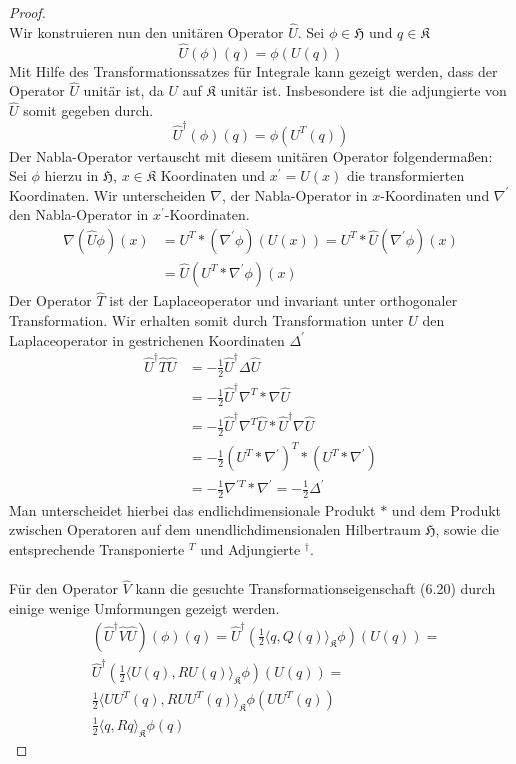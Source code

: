 \documentclass[11pt,a4paper,leqno]{report}
\numberwithin{equation}{chapter}
\begin{document}
\begin{proof}
\begin{equation*}
	\end{equation*}
	Wir konstruieren nun den unit\"aren Operator $\hat{U}$. Sei $\phi\in\mathfrak{H}$ und $q\in\mathfrak{K}$
	\begin{equation*}
		\hat{U}(\phi)(q)=\phi(U(q))
	\end{equation*}
	Mit Hilfe des Transformationssatzes f\"ur Integrale kann gezeigt werden, dass der Operator $\hat{U}$ unit\"ar ist, da $U$ auf $\mathfrak{K}$ unit\"ar ist. Insbesondere ist die adjungierte von $\hat{U}$ somit gegeben durch.	
	\begin{equation*}
		\hat{U}^\dagger(\phi)(q)=\phi(U^T(q))
	\end{equation*}
	Der Nabla-Operator vertauscht mit diesem unit\"aren Operator folgendermaßen:\\
	Sei $\phi$ hierzu in $\mathfrak{H}$, $x\in \mathfrak{K}$ Koordinaten und $x^{'} = U(x)$ die transformierten Koordinaten.  Wir unterscheiden $\nabla$, der Nabla-Operator in $x$-Koordinaten und $\nabla^{'}$ den Nabla-Operator in $x^{'}$-Koordinaten. 
	\begin{align}
		\nabla (\hat{U}\phi)(x) &= U^T * (\nabla^{'} \phi) (U(x)) = U^T * \hat{U}(\nabla^{'} \phi) (x)\\&= \hat{U}(U^T * \nabla^{'} \phi) (x)
	\end{align}
	Der Operator $\hat{T}$ ist der Laplaceoperator und invariant unter orthogonaler Transformation. Wir erhalten somit durch Transformation unter $\hat{U}$ den Laplaceoperator in gestrichenen Koordinaten $\Delta^{'}$
	\begin{align*}
		\hat{U}^\dagger\hat{T}\hat{U} &= -\frac{1}{2}\hat{U}^\dagger\Delta\hat{U}\\ &=-\frac{1}{2}\hat{U}^\dagger\nabla^T * \nabla \hat{U}\\
		&=-\frac{1}{2}\hat{U}^\dagger\nabla^T\hat{U} * \hat{U}^\dagger\nabla \hat{U}\\
		&=-\frac{1}{2}(U^T*\nabla^{'})^T*(U^T*\nabla^{'})\\
		&=-\frac{1}{2}\nabla^{'T}*\nabla^{'} = -\frac{1}{2}\Delta^{'}
	\end{align*}
	Man unterscheidet hierbei das endlichdimensionale Produkt $*$ und dem Produkt zwischen Operatoren auf dem unendlichdimensionalen Hilbertraum $\mathfrak{H}$, sowie die entsprechende Transponierte $^T$ und Adjungierte $^\dagger$.\\  
	\\ 
	F\"ur den Operator $\hat{V}$ kann die gesuchte Transformationseigenschaft (6.20) durch einige wenige Umformungen gezeigt werden.
	\begin{align*}
		&(\hat{U}^\dagger\hat{V}\hat{U})(\phi)(q)= \hat{U}^\dagger(\frac{1}{2}\langle q, Q(q)\rangle_{\mathfrak{K}}\phi)(U(q))=\\
		&\hat{U}^\dagger(\frac{1}{2}\langle U(q), R U(q)\rangle_{\mathfrak{K}}\phi)(U(q))=\\
		&\frac{1}{2}\langle  UU^T(q), R  UU^T(q)\rangle_{\mathfrak{K}}\phi(U U^T(q))\\
		&\frac{1}{2}\langle q, R q\rangle_{\mathfrak{K}}\phi(q)
	\end{align*}

\end{proof}
\end{document}
